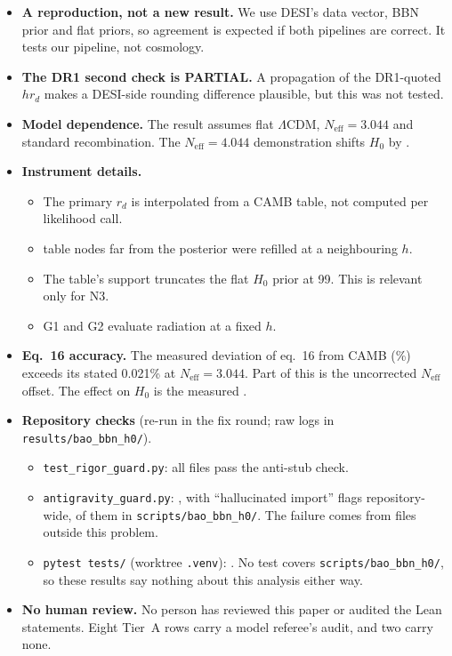 \documentclass[11pt]{article}
\begin{document}
\begin{itemize}
\item \textbf{A reproduction, not a new result.} We use DESI's data vector,
  BBN prior and flat priors, so agreement is expected if both pipelines are
  correct. It tests our pipeline, not cosmology.
\item \textbf{The DR1 second check is PARTIAL.} A propagation of the
  DR1-quoted $h r_d$ makes a DESI-side rounding difference plausible, but
  this was not tested.
\item \textbf{Model dependence.} The result assumes flat $\Lambda$CDM,
  $N_\mathrm{eff}=3.044$ and standard recombination. The
  $N_\mathrm{eff}=4.044$ demonstration shifts $H_0$ by \SensNeff.
\item \textbf{Instrument details.}
  \begin{itemize}
  \item The primary $r_d$ is interpolated from a CAMB table, not computed
    per likelihood call.
  \item \NSubst{} table nodes far from the posterior were refilled at a
    neighbouring $h$.
  \item The table's support truncates the flat $H_0$ prior at 99. This is
    relevant only for N3.
  \item G1 and G2 evaluate radiation at a fixed $h$.
  \end{itemize}
\item \textbf{Eq.~16 accuracy.} The measured deviation of eq.~16 from CAMB
  (\AubMaxAbs\%) exceeds its stated 0.021\% at $N_\mathrm{eff}=3.044$. Part
  of this is the uncorrected $N_\mathrm{eff}$ offset. The effect on $H_0$
  is the measured \DPrimSecOne.
\item \textbf{Repository checks} (re-run in the fix round; raw logs in
  \texttt{results/bao\_bbn\_h0/}).
  \begin{itemize}
  \item \texttt{test\_rigor\_guard.py}: all \RigorFiles{} files pass the
    anti-stub check.
  \item \texttt{antigravity\_guard.py}: \AgStatus, with \AgFlags{}
    ``hallucinated import'' flags repository-wide, \AgOwnFlags{} of them in
    \texttt{scripts/bao\_bbn\_h0/}. The failure comes from files outside
    this problem.
  \item \texttt{pytest tests/} (worktree \texttt{.venv}): \PyResult.
    No test covers \texttt{scripts/bao\_bbn\_h0/}, so these results say
    nothing about this analysis either way.
  \end{itemize}
\item \textbf{No human review.} No person has reviewed this paper or
  audited the Lean statements. Eight Tier~A rows carry a model referee's
  audit, and two carry none.
\end{itemize}
\end{document}
